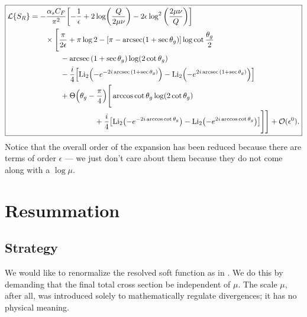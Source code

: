 \documentclass[11pt,twoside,reqno]{amsart}
\theoremstyle{plain}
\theoremstyle{remark}
\theoremstyle{definition}
\theoremstyle{remark}
\theoremstyle{definition}
\theoremstyle{definition}
\newcommand{\cL}{\mathcal{L}}
\newcommand{\cO}{\mathcal{O}}
\newcommand{\Li}{\mathrm{Li}}
\begin{document}
	\begin{equation}\label{eq:transformed soft function partial order}
	\boxed{
	\begin{aligned}
		\cL\qty{S_R} &= -\frac{\alpha_s C_F}{\pi^2}\qty[-\frac{1}{\epsilon} + 2\log(\frac{Q}{2\mu\nu}) - 2\epsilon\log^2\qty(\frac{2\mu\nu}{Q})] \\
			&\qquad\times \Bigg[\frac{\pi}{2\epsilon} + \pi \log 2 - \qty[\pi - \arcsec(1 + \sec\theta_g)]\log\cot\frac{\theta_g}{2} \\
			&\qquad\qquad - \arcsec\qty(1 + \sec\theta_g) \log(2\cot\theta_g) \\
			&\qquad\qquad - \frac{i}{4}\qty[\Li_2\qty(-e^{-2i\arcsec\qty(1 + \sec\theta_g)}) - \Li_2\qty(-e^{2i\arcsec\qty(1 + \sec\theta_g)})] \\
			&\qquad\qquad+ \Theta\qty(\theta_g - \frac{\pi}{4})\Bigg[ \arccos\cot\theta_g \log(2\cot\theta_g) \\
			&\hspace{3cm}+ \frac{i}{4}\qty[\Li_2\qty(-e^{-2i\arccos\cot\theta_g}) - \Li_2\qty(-e^{2i\arccos\cot\theta_g})] \Bigg] \Bigg] + \cO(\epsilon^0).
	\end{aligned}
	}
	\end{equation}
	Notice that the overall order of the expansion has been reduced because there are terms of order $\epsilon$ --- we just don't care about them because they do not come along with a $\log\mu$.


\section{Resummation}
\subsection{Strategy}
	We would like to renormalize the resolved soft function as in \cite{frye_factorization_2016}. We do this by demanding that the final total cross section be independent of $\mu$. The scale $\mu$, after all, was introduced solely to mathematically regulate divergences; it has no physical meaning.
\end{document}
